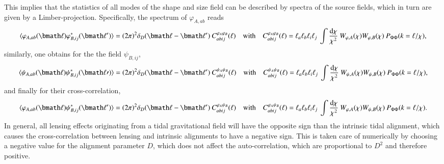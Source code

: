 \documentclass[a4paper,fleqn,usenatbib]{mnras}
\newcommand{\bra}{\langle}
\newcommand{\ket}{\rangle}
\newcommand{\dd}{\mathrm{d}}
\newcommand{\dirac}{\delta_D}
\begin{document}
This implies that the statistics of all modes of the shape and size field can be described by spectra of the source fields, which in turn are given by a Limber-projection. Specifically, the spectrum of $\varphi_{A,ab}$ reads
\begin{equation}
\bra\varphi_{A,ab}(\bmath\ell)\varphi_{B,ij}^*(\bmath\ell^\prime)\ket = 
(2\pi)^2\dirac(\bmath\ell-\bmath\ell^\prime)\:C^{\varphi_A\varphi_B}_{abij}(\ell)
\quad\mathrm{with}\quad
C^{\varphi_A\varphi_B}_{abij}(\ell) = 
\ell_a\ell_b\ell_i\ell_j\:\int\frac{\dd\chi}{\chi^2}\:W_{\varphi,A}(\chi)W_{\varphi,B}(\chi)\:P_{\Phi\Phi}(k = \ell/\chi),
\end{equation}
similarly, one obtains for the the field $\psi_{B,ij}$,
\begin{equation}
\bra\psi_{A,ab}(\bmath\ell)\psi_{B,ij}^*(\bmath\ell\prime)\ket = 
(2\pi)^2\dirac(\bmath\ell-\bmath\ell^\prime)\:C^{\psi_A\psi_B}_{abij}(\ell)
\quad\mathrm{with}\quad
C^{\psi_A\psi_B}_{abij}(\ell) = 
\ell_a\ell_b\ell_i\ell_j\:\int\frac{\dd\chi}{\chi^2}\:W_{\psi,A}(\chi)W_{\psi,B}(\chi)\:P_{\Phi\Phi}(k = \ell/\chi),
\end{equation}
and finally for their cross-correlation,
\begin{equation}
\bra\varphi_{A,ab}(\bmath\ell)\psi_{B,ij}^*(\bmath\ell^\prime)\ket =
(2\pi)^2\dirac(\bmath\ell-\bmath\ell^\prime)\:C^{\varphi_A\psi_B}_{abij}(\ell)
\quad\mathrm{with}\quad
C^{\varphi_A\psi_B}_{abij}(\ell) =
\ell_a\ell_b\ell_i\ell_j\:\int\frac{\dd\chi}{\chi^2}\:W_{\varphi,A}(\chi)W_{\psi,B}(\chi)\:P_{\Phi\Phi}(k = \ell/\chi).
\end{equation}
In general, all lensing effects originating from a tidal gravitational field will have the opposite sign than the intrinsic tidal alignment, which causes the cross-correlation between lensing and intrinsic alignments to have a negative sign. This is taken care of numerically by choosing a negative value for the alignment parameter $D$, which does not affect the auto-correlation, which are proportional to $D^2$ and therefore positive.


\end{document}
